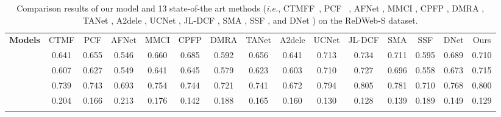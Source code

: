 \documentclass[10pt,twocolumn,letterpaper]{article}
\def\ie{\emph{i.e.}}
\newlength\savedwidth
\newcommand{\whline}[1]{\noalign{\global\savedwidth\arrayrulewidth \global\arrayrulewidth #1}\hline \noalign{\global\arrayrulewidth\savedwidth}}
\begin{document}
\begin{table*}[t!]
  \centering
  \renewcommand{\arraystretch}{1.2}
  \renewcommand{\tabcolsep}{1.99mm}
  \caption{Comparison results of our model and 13 state-of-the art methods (\ie, CTMFF~\cite{han2017cnns}, PCF~ \cite{chen2018progressively}, AFNet \cite{wang2019adaptive}, MMCI \cite{chen2019multi}, CPFP \cite{zhao2019contrast}, DMRA \cite{piao2019depth}, TANet \cite{chen2019three}, A2dele \cite{piao2020}, UCNet \cite{zhang2020uc}, JL-DCF \cite{fu2020jl}, SMA \cite{liu2020}, SSF \cite{zhang2020}, and DNet \cite{fan2019rethinking}) on the ReDWeb-S dataset.} \scriptsize
  \begin{tabular}{r|c|c|c|c|c|c|c|c|c|c|c|c|c|c}
  \whline{1pt}


    \textbf{Models}
    & CTMF & PCF & AFNet   & MMCI  & CPFP   & DMRA & TANet   & A2dele   & UCNet   & JL-DCF & SMA   & SSF  & DNet & Ours\\

    \whline{1pt}

    
    & 0.641    & 0.655    & 0.546  & 0.660      & 0.685    & 0.592  & 0.656 & 0.641    & 0.713  & 0.734   & 0.711 &0.595 & 0.689 & 0.710\\

    
    & 0.607    & 0.627    & 0.549  & 0.641      & 0.645    & 0.579  & 0.623 & 0.603    & 0.710  & 0.727   & 0.696 &0.558 & 0.673 & 0.715\\

    
    & 0.739    & 0.743    & 0.693  & 0.754      & 0.744    & 0.721  & 0.741 & 0.672    & 0.794  & 0.805   & 0.781 &0.710 & 0.768 & 0.800\\

    
    & 0.204    & 0.166    & 0.213  & 0.176      & 0.142    & 0.188  & 0.165 & 0.160    & 0.130  & 0.128   & 0.139 &0.189 & 0.149 & 0.129\\



\whline{1pt}

  \end{tabular}\label{tab2}
\end{table*}
\end{document}
